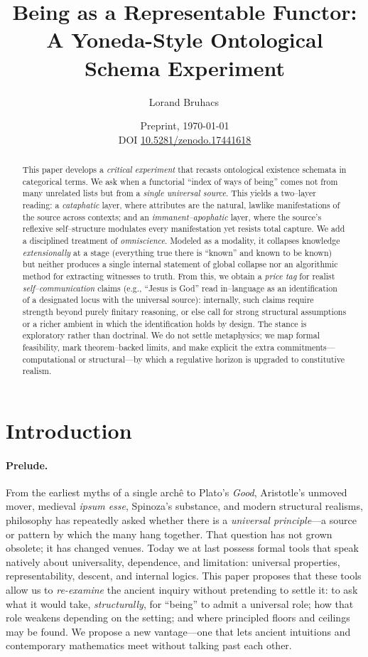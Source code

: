 \documentclass[11pt]{article}
\title{Being as a Representable Functor:\\
A Yoneda-Style Ontological Schema Experiment}
\author{Lorand Bruhacs\,\orcidlink{0009-0004-6751-0715}}
\date{\normalsize Preprint, \today \\ DOI \href{https://doi.org/10.5281/zenodo.17441618}{10.5281/zenodo.17441618}}
\theoremstyle{upright}
\begin{document}
\maketitle

\begin{abstract}
\noindent
This paper develops a \emph{critical experiment} that recasts ontological existence schemata in categorical terms. We ask when a functorial “index of ways of being” comes not from many unrelated lists but from a \emph{single universal source}. This yields a two–layer reading: a \emph{cataphatic} layer, where attributes are the natural, lawlike manifestations of the source across contexts; and an \emph{immanent–apophatic} layer, where the source’s reflexive self–structure modulates every manifestation yet resists total capture. We add a disciplined treatment of \emph{omniscience}. Modeled as a modality, it collapses knowledge \emph{extensionally} at a stage (everything true there is “known” and known to be known) but neither produces a single internal statement of global collapse nor an algorithmic method for extracting witnesses to truth. From this, we obtain a \emph{price tag} for realist \emph{self–communication} claims (e.g., ``Jesus is God'' read in–language as an identification of a designated locus with the universal source): internally, such claims require strength beyond purely finitary reasoning, or else call for strong structural assumptions or a richer ambient in which the identification holds by design. The stance is exploratory rather than doctrinal. We do not settle metaphysics; we map formal feasibility, mark theorem–backed limits, and make explicit the extra commitments—computational or structural—by which a regulative horizon is upgraded to constitutive realism.
\end{abstract}

\tableofcontents

\section{Introduction}

\paragraph{Prelude.}
From the earliest myths of a single archê to Plato’s \emph{Good}, Aristotle’s unmoved mover, medieval \emph{ipsum esse}, Spinoza’s substance, and modern structural realisms, philosophy has repeatedly asked whether there is a \emph{universal principle}—a source or pattern by which the many hang together. That question has not grown obsolete; it has changed venues. Today we at last possess formal tools that speak natively about universality, dependence, and limitation: universal properties, representability, descent, and internal logics. This paper proposes that these tools allow us to \emph{re-examine} the ancient inquiry without pretending to settle it: to ask what it would take, \emph{structurally}, for “being” to admit a universal role; how that role weakens depending on the setting; and where principled floors and ceilings may be found. We propose a new vantage—one that lets ancient intuitions and contemporary mathematics meet without talking past each other.
\end{document}
